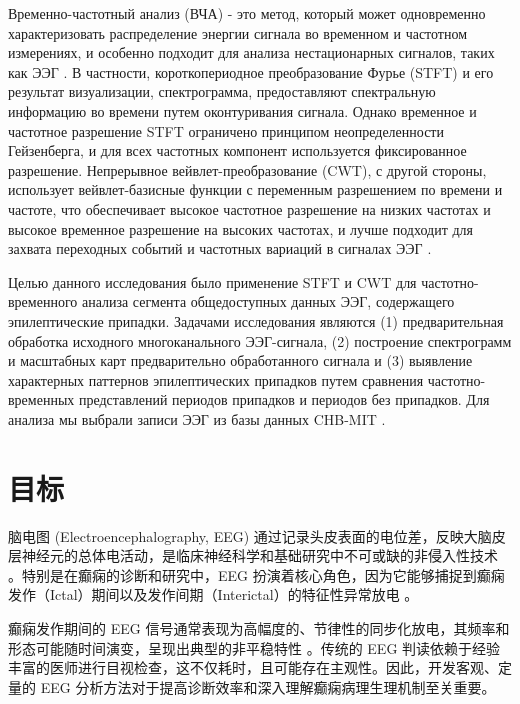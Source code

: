 \documentclass{article}
\providecommand{\pcsync}{\par\vspace{\baselineskip}} %
\begin{document}
\begin{paracol}{2}
Временно-частотный анализ (ВЧА) - это метод, который может одновременно характеризовать распределение энергии сигнала во временном и частотном измерениях, и особенно подходит для анализа нестационарных сигналов, таких как ЭЭГ \cite{Cohen1995}. В частности, короткопериодное преобразование Фурье (STFT) и его результат визуализации, спектрограмма, предоставляют спектральную информацию во времени путем оконтуривания сигнала. Однако временное и частотное разрешение STFT ограничено принципом неопределенности Гейзенберга, и для всех частотных компонент используется фиксированное разрешение. Непрерывное вейвлет-преобразование (CWT), с другой стороны, использует вейвлет-базисные функции с переменным разрешением по времени и частоте, что обеспечивает высокое частотное разрешение на низких частотах и высокое временное разрешение на высоких частотах, и лучше подходит для захвата переходных событий и частотных вариаций в сигналах ЭЭГ \cite{Torrence1998}.

Целью данного исследования было применение STFT и CWT для частотно-временного анализа сегмента общедоступных данных ЭЭГ, содержащего эпилептические припадки. Задачами исследования являются (1) предварительная обработка исходного многоканального ЭЭГ-сигнала, (2) построение спектрограмм и масштабных карт предварительно обработанного сигнала и (3) выявление характерных паттернов эпилептических припадков путем сравнения частотно-временных представлений периодов припадков и периодов без припадков. Для анализа мы выбрали записи ЭЭГ из базы данных CHB-MIT \cite{Shoeb2009}.

\switchcolumn %

\section{目标}
\pcsync %

脑电图 (Electroencephalography, EEG) 通过记录头皮表面的电位差，反映大脑皮层神经元的总体电活动，是临床神经科学和基础研究中不可或缺的非侵入性技术 \cite{Niedermeyer2005}。特别是在癫痫的诊断和研究中，EEG 扮演着核心角色，因为它能够捕捉到癫痫发作（Ictal）期间以及发作间期（Interictal）的特征性异常放电 \cite{Engel2008}。

癫痫发作期间的 EEG 信号通常表现为高幅度的、节律性的同步化放电，其频率和形态可能随时间演变，呈现出典型的非平稳特性 \cite{Jiruska2013}。传统的 EEG 判读依赖于经验丰富的医师进行目视检查，这不仅耗时，且可能存在主观性。因此，开发客观、定量的 EEG 分析方法对于提高诊断效率和深入理解癫痫病理生理机制至关重要。


\end{paracol}
\end{document}

